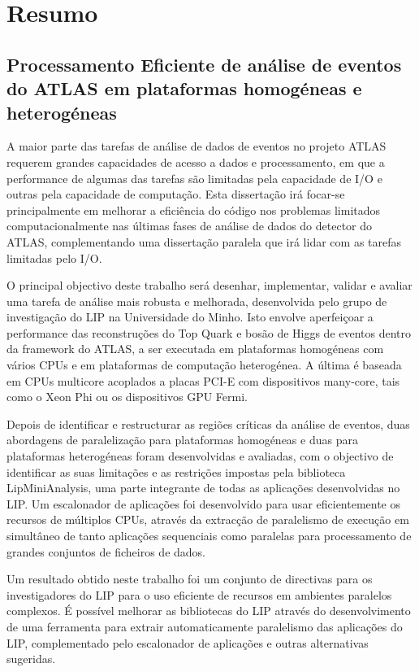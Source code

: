 \chapter*{Resumo}
\label{Resumo}

\section*{Processamento Eficiente de análise de eventos do ATLAS em plataformas homogéneas e heterogéneas}

A maior parte das tarefas de análise de dados de eventos no projeto ATLAS requerem grandes capacidades de acesso a dados e processamento, em que a performance de algumas das tarefas são limitadas pela capacidade de I/O e outras pela capacidade de computação. Esta dissertação irá focar-se principalmente em melhorar a eficiência do código nos problemas limitados computacionalmente nas últimas fases de análise de dados do detector do ATLAS, complementando uma dissertação paralela que irá lidar com as tarefas limitadas pelo I/O.

O principal objectivo deste trabalho será desenhar, implementar, validar e avaliar uma tarefa de análise mais robusta e melhorada, desenvolvida pelo grupo de investigação do LIP na Universidade do Minho. Isto envolve aperfeiçoar a performance das reconstruções do Top Quark e bosão de Higgs de eventos dentro da framework do ATLAS, a ser executada em plataformas homogéneas com vários CPUs e em plataformas de computação heterogénea. A última é baseada em CPUs multicore acoplados a placas PCI-E com dispositivos many-core, tais como o \intel Xeon Phi ou os dispositivos GPU \nvidia Fermi.

Depois de identificar e restructurar as regiões críticas da análise de eventos, duas abordagens de paralelização para plataformas homogéneas e duas para plataformas heterogéneas foram desenvolvidas e avaliadas, com o objectivo de identificar as suas limitações e as restrições impostas pela biblioteca LipMiniAnalysis, uma parte integrante de todas as aplicações desenvolvidas no LIP. Um escalonador de aplicações foi desenvolvido para usar eficientemente os recursos de múltiplos CPUs, através da extracção de paralelismo de execução em simultâneo de tanto aplicações sequenciais como paralelas para processamento de grandes conjuntos de ficheiros de dados.

Um resultado obtido neste trabalho foi um conjunto de directivas para os investigadores do LIP para o uso eficiente de recursos em ambientes paralelos complexos. É possível melhorar as bibliotecas do LIP através do desenvolvimento de uma ferramenta para extrair automaticamente paralelismo das aplicações do LIP, complementado pelo escalonador de aplicações e outras alternativas sugeridas.